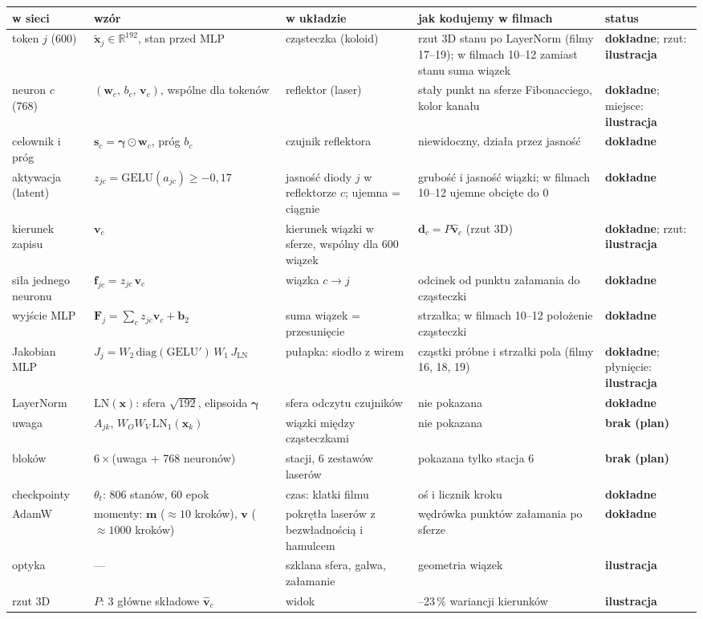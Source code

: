 \documentclass[a4paper,landscape,11pt]{article}
\newcommand{\DOK}{\textcolor{dok}{\textbf{dokładne}}}
\newcommand{\ILU}{\textcolor{ilu}{\textbf{ilustracja}}}
\newcommand{\PLAN}{\textcolor{uwaga}{\textbf{brak (plan)}}}
\begin{document}
\begin{minipage}[t]{0.58\linewidth}
\vspace{0pt}
\scriptsize
\setlength{\tabcolsep}{2.5pt}
\renewcommand{\arraystretch}{1.2}
\begin{tabular}{>{\raggedright\arraybackslash}p{2.1cm}>{\raggedright\arraybackslash}p{3.35cm}>{\raggedright\arraybackslash}p{3.0cm}>{\raggedright\arraybackslash}p{3.9cm}>{\raggedright\arraybackslash}p{1.6cm}}
\toprule
\textbf{w sieci} & \textbf{wzór} & \textbf{w układzie} & \textbf{jak kodujemy w filmach} & \textbf{status}\\\midrule
token $j$ (600) & $\tilde{\bm x}_j\in\mathbb R^{192}$, stan przed MLP & cząsteczka (koloid) & rzut 3D stanu po LayerNorm (filmy 17--19); w filmach 10--12 zamiast stanu suma wiązek & \DOK; rzut: \ILU\\
neuron $c$ (768) & $(\bm w_c,\,b_c,\,\bm v_c)$, wspólne dla tokenów & reflektor (laser) & stały punkt na sferze Fibonacciego, kolor kanału & \DOK; miejsce: \ILU\\
celownik i próg & $\bm s_c=\bm\gamma\odot\bm w_c$, próg $b_c$ & czujnik reflektora & niewidoczny, działa przez jasność & \DOK\\
aktywacja (latent) & $z_{jc}=\mathrm{GELU}(a_{jc})\ge-0{,}17$ & jasność diody $j$ w reflektorze $c$; ujemna = ciągnie & grubość i jasność wiązki; w filmach 10--12 ujemne obcięte do 0 & \DOK\\
kierunek zapisu & $\bm v_c$ & kierunek wiązki w sferze, wspólny dla 600 wiązek & $\bm d_c=P\hat{\bm v}_c$ (rzut 3D) & \DOK; rzut: \ILU\\
siła jednego neuronu & $\bm f_{jc}=z_{jc}\,\bm v_c$ & wiązka $c\to j$ & odcinek od punktu załamania do cząsteczki & \DOK\\
wyjście MLP & $\bm F_j=\sum_c z_{jc}\bm v_c+\bm b_2$ & suma wiązek = przesunięcie & strzałka; w filmach 10--12 położenie cząsteczki & \DOK\\
Jakobian MLP & $J_j=W_2\,\mathrm{diag}(\mathrm{GELU}')\,W_1\,J_{\mathrm{LN}}$ & pułapka: siodło z wirem & cząstki próbne i strzałki pola (filmy 16, 18, 19) & \DOK; płynięcie: \ILU\\
LayerNorm & $\mathrm{LN}(\bm x)$: sfera $\sqrt{192}$, elipsoida $\bm\gamma$ & sfera odczytu czujników & nie pokazana & \DOK\\
uwaga & $A_{jk}$, $W_OW_V\,\mathrm{LN}_1(\bm x_k)$ & wiązki między cząsteczkami & nie pokazana & \PLAN\\
6 bloków & $6\times$(uwaga + 768 neuronów) & 6 stacji, 6 zestawów laserów & pokazana tylko stacja 6 & \PLAN\\
checkpointy & $\theta_t$: 806 stanów, 60 epok & czas: klatki filmu & oś i licznik kroku & \DOK\\
AdamW & momenty: $\bm m$ ($\approx10$ kroków), $\bm v$ ($\approx1000$ kroków) & pokrętła laserów z bezwładnością i hamulcem & wędrówka punktów załamania po sferze & \DOK\\
optyka & --- & szklana sfera, galwa, załamanie & geometria wiązek & \ILU\\
rzut 3D & $P$: 3 główne składowe $\hat{\bm v}_c$ & widok & 3--23\,\% wariancji kierunków & \ILU\\\bottomrule
\end{tabular}


\end{minipage}
\end{document}
